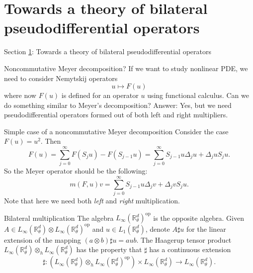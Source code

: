 \documentclass{beamer}
\numberwithin{equation}{section}
\theoremstyle{plain}
\theoremstyle{plain}
\theoremstyle{definition}
\theoremstyle{plain}
\theoremstyle{plain}
\theoremstyle{definition}
\newcommand{\Rl}{\mathbb{R}}
\newcommand{\dmult}{\sharp}
\newcommand{\op}{\mathrm{op}}
\begin{document}
\section{Towards a theory of bilateral pseudodifferential operators}\label{towards_section}

\begin{frame}
    \Huge{Section \ref{towards_section}: Towards a theory of bilateral pseudodifferential operators}
\end{frame}

\begin{frame}{Noncommutative Meyer decomposition?}
    If we want to study nonlinear PDE, we need to consider Nemytskij operators
    \[
        u\mapsto F(u)
    \]
    where now $F(u)$ is defined for an operator $u$ using functional calculus. Can we do something similar to Meyer's decomposition?
    \pause
    Answer: Yes, but we need pseudodifferential operators formed out of both left and right multipliers.
\end{frame}

\begin{frame}{Simple case of a noncommutative Meyer decomposition}
    Consider the case $F(u) = u^2.$ Then
    \[
        F(u) = \sum_{j=0}^\infty F(S_{j}u)-F(S_{j-1}u) = \sum_{j=0}^\infty S_{j-1}u \Delta_j u + \Delta_j u S_j u.
    \]
    So the Meyer operator should be the following:
    \[
        m(F,u)v = \sum_{j=0}^\infty S_{j-1}u\Delta_j v+\Delta_j v S_{j}u.
    \]
    Note that here we need both \emph{left} and \emph{right} multiplication.
\end{frame}

\begin{frame}{Bilateral multiplication}
The algebra $L_\infty(\Rl^d_\theta)^\op$ is the opposite algebra. Given $A \in L_\infty(\Rl^d_\theta)\otimes L_\infty(\Rl^d_\theta)^{\mathrm{op}}$
and $u \in L_1(\Rl^d_\theta)$, denote $A\dmult u$ for the linear extension of the mapping $(a\otimes b)\dmult u = aub$.
The Haagerup tensor product $L_\infty(\Rl^d_\theta)\otimes_h L_\infty(\Rl^d_\theta)$ has the property that $\dmult$ has a continuous extension
\[
    \dmult:(L_{\infty}(\Rl^d_\theta)\otimes_{h} L_{\infty}(\Rl^d_\theta)^{\op})\times L_{\infty}(\Rl^d_\theta)\to L_{\infty}(\Rl^d_\theta).
\]
\end{frame}
\end{document}
